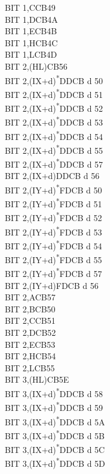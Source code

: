 \documentclass[oneside,a4paper]{book}
\begin{document}
\begin{multicols}{3}
{\begin{tabbing}
BIT 1,C\>CB49\\
BIT 1,D\>CB4A\\
BIT 1,E\>CB4B\\
BIT 1,H\>CB4C\\
BIT 1,L\>CB4D\\
BIT 2,(HL)\>CB56\\
BIT 2,(IX+d)\textsuperscript{*}\>DDCB d 50\\
BIT 2,(IX+d)\textsuperscript{*}\>DDCB d 51\\
BIT 2,(IX+d)\textsuperscript{*}\>DDCB d 52\\
BIT 2,(IX+d)\textsuperscript{*}\>DDCB d 53\\
BIT 2,(IX+d)\textsuperscript{*}\>DDCB d 54\\
BIT 2,(IX+d)\textsuperscript{*}\>DDCB d 55\\
BIT 2,(IX+d)\textsuperscript{*}\>DDCB d 57\\
BIT 2,(IX+d)\>DDCB d 56\\
BIT 2,(IY+d)\textsuperscript{*}\>FDCB d 50\\
BIT 2,(IY+d)\textsuperscript{*}\>FDCB d 51\\
BIT 2,(IY+d)\textsuperscript{*}\>FDCB d 52\\
BIT 2,(IY+d)\textsuperscript{*}\>FDCB d 53\\
BIT 2,(IY+d)\textsuperscript{*}\>FDCB d 54\\
BIT 2,(IY+d)\textsuperscript{*}\>FDCB d 55\\
BIT 2,(IY+d)\textsuperscript{*}\>FDCB d 57\\
BIT 2,(IY+d)\>FDCB d 56\\
BIT 2,A\>CB57\\
BIT 2,B\>CB50\\
BIT 2,C\>CB51\\
BIT 2,D\>CB52\\
BIT 2,E\>CB53\\
BIT 2,H\>CB54\\
BIT 2,L\>CB55\\
BIT 3,(HL)\>CB5E\\
BIT 3,(IX+d)\textsuperscript{*}\>DDCB d 58\\
BIT 3,(IX+d)\textsuperscript{*}\>DDCB d 59\\
BIT 3,(IX+d)\textsuperscript{*}\>DDCB d 5A\\
BIT 3,(IX+d)\textsuperscript{*}\>DDCB d 5B\\
BIT 3,(IX+d)\textsuperscript{*}\>DDCB d 5C\\
BIT 3,(IX+d)\textsuperscript{*}\>DDCB d 5D\\

\end{tabbing}}
\end{multicols}
\end{document}

